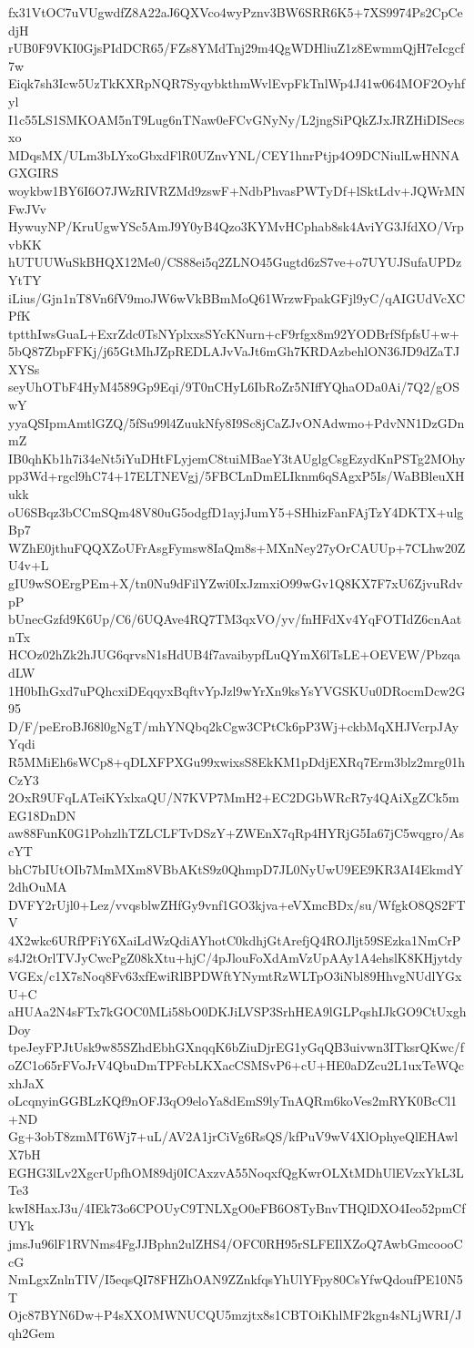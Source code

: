 fx31VtOC7uVUgwdfZ8A22aJ6QXVco4wyPznv3BW6SRR6K5+7XS9974Ps2CpCedjH
rUB0F9VKI0GjsPIdDCR65/FZs8YMdTnj29m4QgWDHliuZ1z8EwmmQjH7eIcgcf7w
Eiqk7sh3Icw5UzTkKXRpNQR7SyqybkthmWvlEvpFkTnlWp4J41w064MOF2Oyhfyl
I1c55LS1SMKOAM5nT9Lug6nTNaw0eFCvGNyNy/L2jngSiPQkZJxJRZHiDISecsxo
MDqsMX/ULm3bLYxoGbxdFlR0UZnvYNL/CEY1hnrPtjp4O9DCNiulLwHNNAGXGIRS
woykbw1BY6I6O7JWzRIVRZMd9zswF+NdbPhvasPWTyDf+lSktLdv+JQWrMNFwJVv
HywuyNP/KruUgwYSc5AmJ9Y0yB4Qzo3KYMvHCphab8sk4AviYG3JfdXO/VrpvbKK
hUTUUWuSkBHQX12Me0/CS88ei5q2ZLNO45Gugtd6zS7ve+o7UYUJSufaUPDzYtTY
iLius/Gjn1nT8Vn6fV9moJW6wVkBBmMoQ61WrzwFpakGFjl9yC/qAIGUdVcXCPfK
tptthIwsGuaL+ExrZdc0TsNYplxxsSYcKNurn+cF9rfgx8m92YODBrfSfpfsU+w+
5bQ87ZbpFFKj/j65GtMhJZpREDLAJvVaJt6mGh7KRDAzbehlON36JD9dZaTJXYSs
seyUhOTbF4HyM4589Gp9Eqi/9T0nCHyL6IbRoZr5NIffYQhaODa0Ai/7Q2/gOSwY
yyaQSIpmAmtlGZQ/5fSu99l4ZuukNfy8I9Sc8jCaZJvONAdwmo+PdvNN1DzGDnmZ
IB0qhKb1h7i34eNt5iYuDHtFLyjemC8tuiMBaeY3tAUglgCsgEzydKnPSTg2MOhy
pp3Wd+rgcl9hC74+17ELTNEVgj/5FBCLnDmELIknm6qSAgxP5Is/WaBBleuXHukk
oU6SBqz3bCCmSQm48V80uG5odgfD1ayjJumY5+SHhizFanFAjTzY4DKTX+ulgBp7
WZhE0jthuFQQXZoUFrAsgFymsw8IaQm8s+MXnNey27yOrCAUUp+7CLhw20ZU4v+L
gIU9wSOErgPEm+X/tn0Nu9dFilYZwi0IxJzmxiO99wGv1Q8KX7F7xU6ZjvuRdvpP
bUnecGzfd9K6Up/C6/6UQAve4RQ7TM3qxVO/yv/fnHFdXv4YqFOTIdZ6cnAatnTx
HCOz02hZk2hJUG6qrvsN1sHdUB4f7avaibypfLuQYmX6lTsLE+OEVEW/PbzqadLW
1H0bIhGxd7uPQhcxiDEqqyxBqftvYpJzl9wYrXn9ksYsYVGSKUu0DRocmDcw2G95
D/F/peEroBJ68l0gNgT/mhYNQbq2kCgw3CPtCk6pP3Wj+ckbMqXHJVcrpJAyYqdi
R5MMiEh6sWCp8+qDLXFPXGu99xwixsS8EkKM1pDdjEXRq7Erm3blz2mrg01hCzY3
2OxR9UFqLATeiKYxlxaQU/N7KVP7MmH2+EC2DGbWRcR7y4QAiXgZCk5mEG18DnDN
aw88FunK0G1PohzlhTZLCLFTvDSzY+ZWEnX7qRp4HYRjG5Ia67jC5wqgro/AscYT
bhC7bIUtOIb7MmMXm8VBbAKtS9z0QhmpD7JL0NyUwU9EE9KR3AI4EkmdY2dhOuMA
DVFY2rUjl0+Lez/vvqsblwZHfGy9vnf1GO3kjva+eVXmcBDx/su/WfgkO8QS2FTV
4X2wkc6URfPFiY6XaiLdWzQdiAYhotC0kdhjGtArefjQ4ROJljt59SEzka1NmCrP
s4J2tOrlTVJyCwcPgZ08kXtu+hjC/4pJlouFoXdAmVzUpAAy1A4ehslK8KHjytdy
VGEx/c1X7sNoq8Fv63xfEwiRlBPDWftYNymtRzWLTpO3iNbl89HhvgNUdlYGxU+C
aHUAa2N4sFTx7kGOC0MLi58bO0DKJiLVSP3SrhHEA9lGLPqshIJkGO9CtUxghDoy
tpeJeyFPJtUsk9w85SZhdEbhGXnqqK6bZiuDjrEG1yGqQB3uivwn3ITksrQKwc/f
oZC1o65rFVoJrV4QbuDmTPFcbLKXacCSMSvP6+cU+HE0aDZcu2L1uxTeWQcxhJaX
oLcqnyinGGBLzKQf9nOFJ3qO9eloYa8dEmS9lyTnAQRm6koVes2mRYK0BcCl1+ND
Gg+3obT8zmMT6Wj7+uL/AV2A1jrCiVg6RsQS/kfPuV9wV4XlOphyeQlEHAwlX7bH
EGHG3lLv2XgcrUpfhOM89dj0ICAxzvA55NoqxfQgKwrOLXtMDhUlEVzxYkL3LTe3
kwI8HaxJ3u/4IEk73o6CPOUyC9TNLXgO0eFB6O8TyBnvTHQlDXO4Ieo52pmCfUYk
jmsJu96lF1RVNms4FgJJBphn2ulZHS4/OFC0RH95rSLFEIlXZoQ7AwbGmcoooCcG
NmLgxZnlnTIV/I5eqsQI78FHZhOAN9ZZnkfqsYhUlYFpy80CsYfwQdoufPE10N5T
Ojc87BYN6Dw+P4sXXOMWNUCQU5mzjtx8s1CBTOiKhlMF2kgn4sNLjWRI/Jqh2Gem
